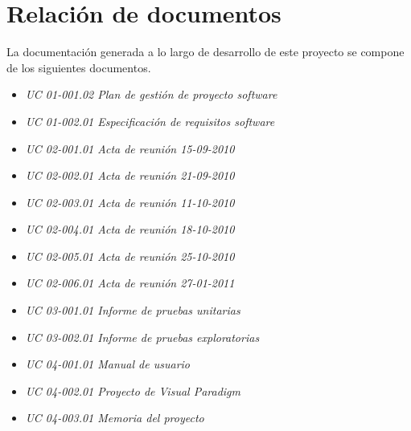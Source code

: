 \chapter{Relación de documentos}

La documentación generada a lo largo de desarrollo de este proyecto se compone
de los siguientes documentos.

\begin{itemize}
\item \textit{UC 01-001.02 Plan de gestión de proyecto software}
\item \textit{UC 01-002.01 Especificación de requisitos software}
\item \textit{UC 02-001.01 Acta de reunión 15-09-2010}
\item \textit{UC 02-002.01 Acta de reunión 21-09-2010}
\item \textit{UC 02-003.01 Acta de reunión 11-10-2010}
\item \textit{UC 02-004.01 Acta de reunión 18-10-2010}
\item \textit{UC 02-005.01 Acta de reunión 25-10-2010}
\item \textit{UC 02-006.01 Acta de reunión 27-01-2011}
\item \textit{UC 03-001.01 Informe de pruebas unitarias}
\item \textit{UC 03-002.01 Informe de pruebas exploratorias}
\item \textit{UC 04-001.01 Manual de usuario}
\item \textit{UC 04-002.01 Proyecto de Visual Paradigm}
\item \textit{UC 04-003.01 Memoria del proyecto}
\end{itemize}
